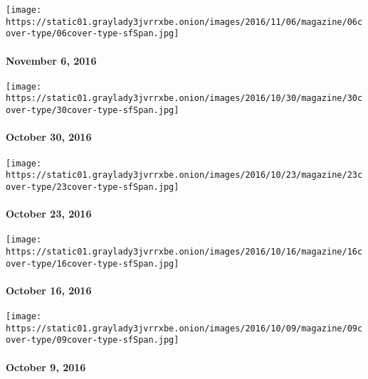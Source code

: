 \texttt{[image: https://static01.graylady3jvrrxbe.onion/images/2016/11/06/magazine/06cover-type/06cover-type-sfSpan.jpg]}

\hypertarget{november-6-2016}{%
\paragraph{November 6, 2016}\label{november-6-2016}}

\href{http://www.nytimes3xbfgragh.onion/indexes/2016/10/30/magazine/index.html}{}

\texttt{[image: https://static01.graylady3jvrrxbe.onion/images/2016/10/30/magazine/30cover-type/30cover-type-sfSpan.jpg]}

\hypertarget{october-30-2016}{%
\paragraph{October 30, 2016}\label{october-30-2016}}

\href{http://www.nytimes3xbfgragh.onion/indexes/2016/10/23/magazine/index.html}{}

\texttt{[image: https://static01.graylady3jvrrxbe.onion/images/2016/10/23/magazine/23cover-type/23cover-type-sfSpan.jpg]}

\hypertarget{october-23-2016}{%
\paragraph{October 23, 2016}\label{october-23-2016}}

\href{http://www.nytimes3xbfgragh.onion/indexes/2016/10/16/magazine/index.html}{}

\texttt{[image: https://static01.graylady3jvrrxbe.onion/images/2016/10/16/magazine/16cover-type/16cover-type-sfSpan.jpg]}

\hypertarget{october-16-2016}{%
\paragraph{October 16, 2016}\label{october-16-2016}}

\href{http://www.nytimes3xbfgragh.onion/indexes/2016/10/09/magazine/index.html}{}

\texttt{[image: https://static01.graylady3jvrrxbe.onion/images/2016/10/09/magazine/09cover-type/09cover-type-sfSpan.jpg]}

\hypertarget{october-9-2016}{%
\paragraph{October 9, 2016}\label{october-9-2016}}

